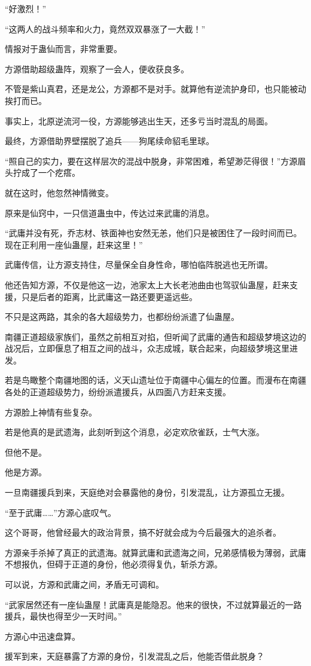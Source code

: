 \begin{this_body}
“好激烈！”

“这两人的战斗频率和火力，竟然双双暴涨了一大截！”

情报对于蛊仙而言，非常重要。

方源借助超级蛊阵，观察了一会人，便收获良多。

不管是紫山真君，还是龙公，方源都不是对手。就算他有逆流护身印，也只能被动挨打而已。

事实上，北原逆流河一役，方源能够逃出生天，还多亏当时混乱的局面。

最终，方源借助界壁摆脱了追兵——狗尾续命貂毛里球。

“照自己的实力，要在这样层次的混战中脱身，非常困难，希望渺茫得很！”方源眉头拧成了一个疙瘩。

就在这时，他忽然神情微变。

原来是仙窍中，一只信道蛊虫中，传达过来武庸的消息。

“武庸并没有死，乔志材、铁面神也安然无恙，他们只是被困住了一段时间而已。现在正利用一座仙蛊屋，赶来这里！”

武庸传信，让方源支持住，尽量保全自身性命，哪怕临阵脱逃也无所谓。

他还告知方源，不仅是他这一边，池家太上大长老池曲由也驾驭仙蛊屋，赶来支援，只是后者的距离，比武庸这一路还要更遥远些。

不只是这两路，其余的各大超级势力，也都纷纷派遣了仙蛊屋。

南疆正道超级家族们，虽然之前相互对掐，但听闻了武庸的通告和超级梦境这边的战况后，立即偃息了相互之间的战斗，众志成城，联合起来，向超级梦境这里进发。

若是鸟瞰整个南疆地图的话，义天山遗址位于南疆中心偏左的位置。而漫布在南疆各处的正道超级势力，纷纷派遣援兵，从四面八方赶来支援。

方源脸上神情有些复杂。

若是他真的是武遗海，此刻听到这个消息，必定欢欣雀跃，士气大涨。

但他不是。

他是方源。

一旦南疆援兵到来，天庭绝对会暴露他的身份，引发混乱，让方源孤立无援。

“至于武庸……”方源心底叹气。

这个哥哥，他曾经最大的政治背景，搞不好就会成为今后最强大的追杀者。

方源亲手杀掉了真正的武遗海。就算武庸和武遗海之间，兄弟感情极为薄弱，武庸不想报仇，但碍于正道的身份，他必须得复仇，斩杀方源。

可以说，方源和武庸之间，矛盾无可调和。

“武家居然还有一座仙蛊屋！武庸真是能隐忍。他来的很快，不过就算最近的一路援兵，最快也得至少一天时间。”

方源心中迅速盘算。

援军到来，天庭暴露了方源的身份，引发混乱之后，他能否借此脱身？

\end{this_body}

